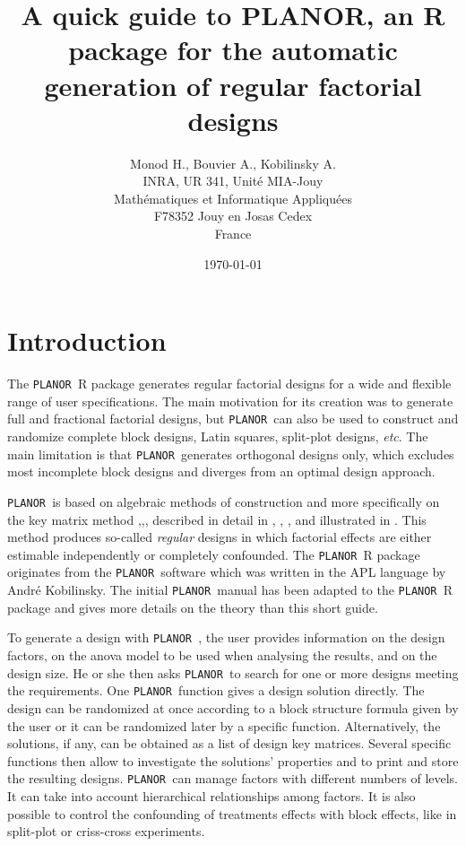 \documentclass[a4paper]{article}
\newcommand{\PLANOR}{\texttt{PLANOR }}
\begin{document}
\title{A quick guide to PLANOR, an R package for the automatic
  generation of regular factorial designs} 


\author{Monod H., Bouvier A., Kobilinsky A.\\[2mm] 
  INRA, UR 341, Unit\'e MIA-Jouy \\ 
  Math\'ematiques
et Informatique Appliqu\'ees \\ F78352 Jouy en Josas Cedex\\ France}
\date{\today}
\maketitle
\tableofcontents
\medskip



\section{Introduction}

The \PLANOR R package generates regular factorial designs for a wide
and flexible range of user specifications. The main motivation for
its creation was to generate full and fractional factorial
designs, but \PLANOR can also be used to construct and randomize
complete block designs, Latin squares, split-plot designs,
\emph{etc}. The main limitation is that \PLANOR generates
orthogonal designs only, which excludes most incomplete block designs
and diverges from an optimal design approach. 

\PLANOR is based on algebraic methods of construction and more
specifically on the key matrix method
\cite{bailey85},\cite{franklin85},\cite{patterson78}, described in detail
in \cite{kobiasu97}, \cite{kobimonod91}, \cite{kobimonod94}, and 
illustrated in \cite{cliquet94}. This method produces so-called {\em
  regular} designs in which factorial effects are either estimable
independently or completely confounded. The \PLANOR R package
originates from the \PLANOR software which was written in the APL
language by Andr\'e Kobilinsky. The initial \PLANOR manual
\cite{kobi05} has been adapted to the \PLANOR R package \cite{kobi11}
and gives more details on the theory than this short guide.

To generate a design with \PLANOR, the user provides information on
the design factors, on the anova model to be used when analysing the
results, and on the design size. He or she then asks \PLANOR to search
for one or more designs meeting the requirements. One \PLANOR function
gives a design solution directly. The design can be randomized at once
according to a block structure formula given by the user or it can be
randomized later by a specific function. Alternatively, the solutions, if
any, can be obtained as a list of design key matrices. Several
specific functions then allow to investigate the solutions' properties
and to print and store the resulting designs. \PLANOR can manage
factors with different numbers of levels. It can take into account
hierarchical relationships among factors. It is also possible to
control the confounding of treatments effects with block effects, like
in split-plot or criss-cross experiments.
\end{document}

